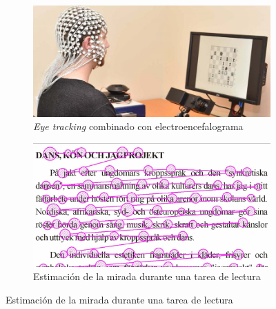 \documentclass[aspectratio=169]{beamer}
\begin{document}
\begin{frame}{~}
  \begin{figure}
    \begin{subfigure}{0.49\textwidth}
      \centering
      \includegraphics[width=\linewidth]{img/eye-link-eeg.jpg}
      \caption{\textit{Eye tracking} combinado con electroencefalograma}
    \end{subfigure}
    \begin{subfigure}{0.49\textwidth}
      \centering
      \includegraphics[width=\linewidth]{img/reading-fixations-saccades.jpg}
      \caption{Estimación de la mirada durante una tarea de lectura}
    \end{subfigure}
  \end{figure}

\end{frame}
\end{document}
